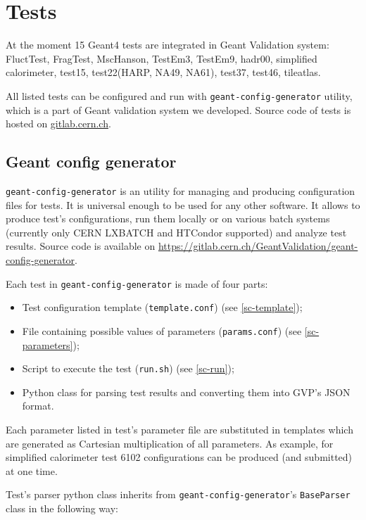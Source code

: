 \section{Tests}
\label{sec-tests}

At the moment 15 Geant4 tests are integrated in Geant Validation system: FluctTest, FragTest, MscHanson, TestEm3, TestEm9, hadr00, simplified calorimeter, test15, test22(HARP, NA49, NA61), test37, test46, tileatlas.

All listed tests can be configured and run with {\tt geant-config-generator} utility, which is a part of Geant validation system we developed. Source code of tests is hosted on \url{gitlab.cern.ch}.

\subsection{Geant config generator}
\label{sec-geant-config-generator}

{\tt geant-config-generator} is an utility for managing and producing configuration files for tests. It is universal enough to be used for any other software. It allows to produce test's configurations, run them locally or on various batch systems (currently only CERN LXBATCH and HTCondor supported) and analyze test results. Source code is available on \url{https://gitlab.cern.ch/GeantValidation/geant-config-generator}.

Each test in {\tt geant-config-generator} is made of four parts:

\begin{itemize}
	\item Test configuration template ({\tt template.conf}) (see \ref{sc-template});
	\item File containing possible values of parameters ({\tt params.conf}) (see \ref{sc-parameters});
	\item Script to execute the test ({\tt run.sh}) (see \ref{sc-run});
	\item Python class for parsing test results and converting them into GVP's JSON format.
\end{itemize}

Each parameter listed in test's parameter file are substituted in templates which are generated as Cartesian multiplication of all parameters. As example, for simplified calorimeter test 6102 configurations can be produced (and submitted) at one time.

Test's parser python class inherits from {\tt geant-config-generator}'s {\tt BaseParser} class in the following way:

